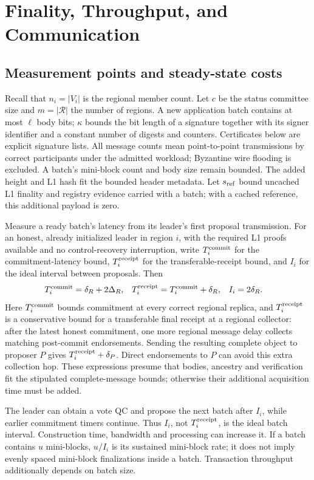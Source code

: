 \documentclass[11pt,a4paper,onecolumn]{article}
\begin{document}
\section{Finality, Throughput, and Communication}\label{sec:complexity}
\subsection{Measurement points and steady-state costs}
Recall that $n_i=|V_i|$ is the regional member count. Let $c$ be the status
committee size and $m=|\mathcal R|$ the number of regions.
A new application batch contains at most $\ell$ body bits;
$\kappa$ bounds the bit length of a signature together with its signer
identifier and a constant number of digests and counters. Certificates below are explicit
signature lists. All message counts mean point-to-point transmissions by
correct participants under the admitted workload; Byzantine wire flooding
is excluded. A batch's mini-block count and body size remain bounded.
The added height and L1 hash fit the bounded header metadata. Let
$s_{\rm ref}$ bound uncached L1 finality and registry evidence carried with
a batch; with a cached reference, this additional payload is zero.

Measure a ready batch's latency from its leader's first proposal transmission.
For an honest, already initialized leader in region $i$, with the required
L1 proofs available and no control-recovery interruption, write
$T_i^{\rm commit}$ for the commitment-latency bound,
$T_i^{\rm receipt}$ for the transferable-receipt bound, and $I_i$ for
the ideal interval between proposals. Then
\[
 \begin{aligned}
 T_i^{\rm commit}&=\delta_R+2\Delta_R,&
 T_i^{\rm receipt}&=T_i^{\rm commit}+\delta_R,&
 I_i&=2\delta_R.
 \end{aligned}
\]
Here $T_i^{\rm commit}$ bounds commitment at every correct regional replica, and $T_i^{\rm receipt}$
is a conservative bound for a transferable final receipt at a regional
collector: after the latest honest commitment, one more regional message
delay collects matching post-commit endorsements. Sending the resulting
complete object to proposer $P$ gives $T_i^{\rm receipt}+\delta_P$. Direct endorsements
to $P$ can avoid this extra collection hop. These expressions presume
that bodies, ancestry and verification fit the stipulated complete-message
bounds; otherwise their additional acquisition time must be added.

The leader can obtain a vote QC and propose the next batch after $I_i$,
while earlier commitment timers continue. Thus $I_i$, not $T_i^{\rm receipt}$, is the
ideal batch interval. Construction time, bandwidth and processing can
increase it. If a batch contains $u$ mini-blocks, $u/I_i$ is its sustained
mini-block rate; it does not imply evenly spaced mini-block finalizations
inside a batch. Transaction throughput additionally depends on batch size.
\end{document}
